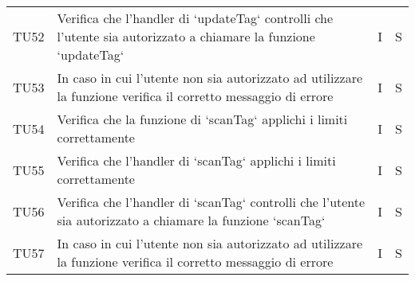 \begin{center}
\begin{longtable}[!h]{p{45px} p{255px} p{35px} p{35px}}
        TU52          & Verifica che l'handler di `updateTag` controlli che l'utente sia autorizzato a chiamare la funzione `updateTag`                                                                                  & I              & S              \\
        TU53          & In caso in cui l'utente non sia autorizzato ad utilizzare la funzione verifica il corretto messaggio di errore                                                                                   & I              & S              \\
        TU54          & Verifica che la funzione di `scanTag` applichi i limiti correttamente                                                                                                                            & I              & S              \\
        TU55          & Verifica che l'handler di `scanTag` applichi i limiti correttamente                                                                                                                              & I              & S              \\
        TU56          & Verifica che l'handler di `scanTag` controlli che l'utente sia autorizzato a chiamare la funzione `scanTag`                                                                                      & I              & S              \\
        TU57          & In caso in cui l'utente non sia autorizzato ad utilizzare la funzione verifica il corretto messaggio di errore                                                                                   & I              & S              \\
    \end{longtable}
\end{center}

